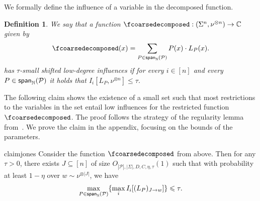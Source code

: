 \documentclass[11pt]{article}
\newtheorem{definition}[thm]{Definition}
\newcommand\spn{{\sf span}_{\mathbb{N}}}
\renewcommand\leq{\leqslant}
\newcommand{\V}[1]{{#1}}
\begin{document}
We formally define the influence of a variable in the decomposed function. 

\begin{definition}
    We say that a function $\fcoarsedecomposed: (\Sigma^n, \nu^{\otimes n})\rightarrow \mathbb{C}$ given by 
     \[
	\fcoarsedecomposed(\V x) = \sum\limits_{P\in\spn(\mathcal{P})} P(\V x) \cdot L_P(\V x).
	\]
    has $\tau$-small shifted low-degree influences if for every $i\in [n]$  and every $P\in\spn(\mathcal{P})$ it holds that $I_i[L_P, \nu^{\otimes n}]\leq \tau$.
\end{definition}

The following claim shows the existence of a small set such that most restrictions to the variables in the set entail low influences for the restricted function $\fcoarsedecomposed$.   The proof follows the strategy of the regularity lemma from~\cite{Jones}. We prove the claim in the appendix, focusing on the bounds of the parameters.

\begin{restatable}{claim}{jones}\label{claim:influence_removal}
    Consider the function  $\fcoarsedecomposed$ from above. Then for any $\tau>0$, there exists $J\subseteq [n]$ of size $O_{|\mathcal{P}|, |\Sigma|, D, C,\eta, \tau}(1)$ such that with probability at least $1-\eta$ over  $\V w\sim \nu^{\otimes |J|}$, we have
    $$ \max_{P\in \spn(\mathcal{P})} \{ \max_i I_i[(L_P)_{J\rightarrow \V w}]\}\leq \tau.$$
\end{restatable}
\end{document}
